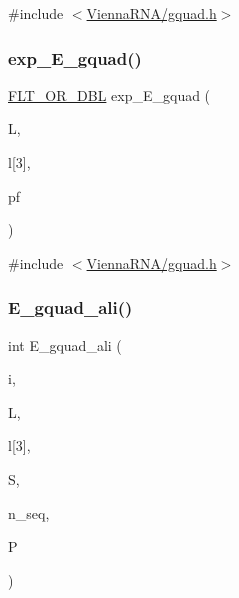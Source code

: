 {\ttfamily \#include $<$\mbox{\hyperlink{gquad_8h}{Vienna\+R\+N\+A/gquad.\+h}}$>$}

\mbox{\label{group__gquads_ga4dbda5faf903ca987b296a7629764221}} 
\subsubsection{\texorpdfstring{exp\+\_\+\+E\+\_\+gquad()}{exp\_E\_gquad()}}
{\footnotesize\ttfamily \mbox{\hyperlink{group__data__structures_ga31125aeace516926bf7f251f759b6126}{F\+L\+T\+\_\+\+O\+R\+\_\+\+D\+BL}} exp\+\_\+\+E\+\_\+gquad (\begin{DoxyParamCaption}\item[{int}]{L,  }\item[{int}]{l\mbox{[}3\mbox{]},  }\item[{\mbox{\hyperlink{group__energy__parameters_ga01d8b92fe734df8d79a6169482c7d8d8}{vrna\+\_\+exp\+\_\+param\+\_\+t}} $\ast$}]{pf }\end{DoxyParamCaption})}



{\ttfamily \#include $<$\mbox{\hyperlink{gquad_8h}{Vienna\+R\+N\+A/gquad.\+h}}$>$}

\mbox{\label{group__gquads_gad6cd438e9e9bd37b57b361b8ce2fd51a}} 
\subsubsection{\texorpdfstring{E\+\_\+gquad\+\_\+ali()}{E\_gquad\_ali()}}
{\footnotesize\ttfamily int E\+\_\+gquad\+\_\+ali (\begin{DoxyParamCaption}\item[{int}]{i,  }\item[{int}]{L,  }\item[{int}]{l\mbox{[}3\mbox{]},  }\item[{const short $\ast$$\ast$}]{S,  }\item[{int}]{n\+\_\+seq,  }\item[{\mbox{\hyperlink{group__energy__parameters_ga8a69ca7d787e4fd6079914f5343a1f35}{vrna\+\_\+param\+\_\+t}} $\ast$}]{P }\end{DoxyParamCaption})}



